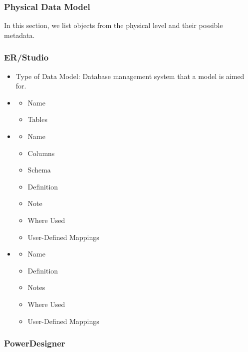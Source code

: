 \subsubsection{Physical Data Model}

In this section, we list objects from the physical level and their possible metadata.

\subsubsection{ER/Studio}

\begin{itemize}
	\item Type of Data Model: Database management system that a model is aimed for.
	\item {}
	\begin{itemize}
		\item Name
		\item Tables
	\end{itemize}
	\item {}
	\begin{itemize}
		\item Name
		\item Columns
		\item Schema
		\item Definition
		\item Note
		\item Where Used
		\item User-Defined Mappings
	\end{itemize}
	\item {}
	\begin{itemize}
		\item Name
		\item Definition
		\item Notes
		\item Where Used
		\item User-Defined Mappings
	\end{itemize}
\end{itemize}

\subsubsection{PowerDesigner}

